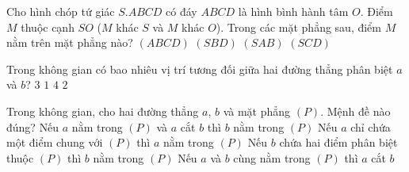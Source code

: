 \begin{ex}%
	Cho hình chóp tứ giác $S.ABCD$ có đáy $ABCD$ là hình bình hành tâm $O$. Điểm $M$ thuộc cạnh $SO$  ($M$ khác $S$ và $M$ khác $O$). Trong các mặt phẳng sau, điểm $M$ nằm trên mặt phẳng nào?
	\choice 
		 {$\left(ABCD\right)$}
		{\True  $\left(SBD\right)$}
		{$\left(SAB\right)$} 
		{$\left(SCD\right)$} 
\end{ex}

\begin{ex}%
	Trong không gian có bao nhiêu vị trí tương đối giữa hai đường thẳng phân biệt $a$ và $b$? 
	 \choice
		{\True $3$} 
		 {$1$}
		 {$4$}
		{$2$} 
\end{ex}

\begin{ex}%
	Trong không gian, cho hai đường thẳng $a$, $b$ và mặt phẳng $\left( P \right)$. Mệnh đề nào đúng? 
	\choice 
		{Nếu $a$ nằm trong $\left( P \right)$ và  $a$ cắt $b$ thì $b$ nằm trong $\left( P \right)$}
		{Nếu $a$ chỉ chứa một điểm chung với $\left( P \right)$ thì $a$ nằm trong $\left( P \right)$} 
		{\True Nếu $b$ chứa hai điểm phân biệt thuộc $\left( P \right)$ thì $b$ nằm  trong $\left( P \right)$}
		{Nếu $a$ và $b$ cùng nằm trong $\left( P \right)$ thì  $a$ cắt $b$}
	 \loigiai{}
\end{ex}

